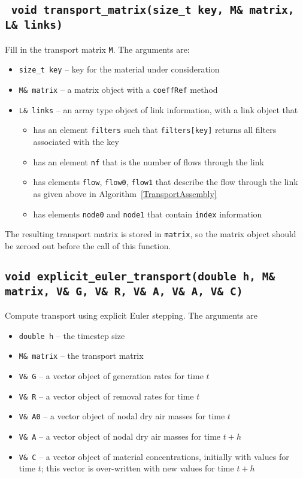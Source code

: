 \documentclass[10pt]{report}
\newcommand{\algoref}[1]{Algorithm~\ref{#1}}
\begin{document}
\subsection{\texttt{ void transport\_matrix(size\_t key, M\& matrix, L\& links)}}
Fill in the transport matrix \texttt{M}. The arguments are:
\begin{itemize}
\item \texttt{size\_t key} -- key for the material under consideration
\item \texttt{M\& matrix} -- a matrix object with a \texttt{coeffRef} method
\item \texttt{L\& links} -- an array type object of link information, with a link object that
\begin{itemize}
\item has an element \texttt{filters} such that \texttt{filters[key]} returns all filters associated with the key
\item has an  element \texttt{nf} that is the number of flows through the link
\item has elements \texttt{flow}, \texttt{flow0}, \texttt{flow1} that describe the flow through the link as given above in \algoref{TransportAssembly}
\item has elements \texttt{node0} and \texttt{node1} that contain \texttt{index} information
\end{itemize}
\end{itemize}
The resulting transport matrix is stored in \texttt{matrix}, so the matrix object should be
zeroed out before the call of this function.
\subsection{\texttt{void explicit\_euler\_transport(double h, M\& matrix, V\& G, V\& R, V\& A, V\& A, V\& C)}}
Compute transport using explicit Euler stepping. The arguments are
\begin{itemize}
\item \texttt{double h} -- the timestep size
\item \texttt{M\& matrix} -- the transport matrix
\item \texttt{V\& G} -- a vector object of generation rates for time $t$
\item \texttt{V\& R} -- a vector object of removal rates for time $t$
\item \texttt{V\& A0} -- a vector object of nodal dry air masses for time $t$
\item \texttt{V\& A} -- a vector object of nodal dry air masses for time $t+h$
\item \texttt{V\& C} -- a vector object of material concentrations, initially with values for time $t$; this vector is over-written with new values for time $t+h$
\end{itemize}
\end{document}
